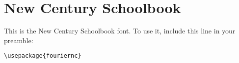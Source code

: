 \documentclass{article}
\begin{document}
\section*{New Century Schoolbook}
This is the New Century Schoolbook font.
To use it, include this line in your preamble:
\begin{verbatim}
\usepackage{fouriernc}
\end{verbatim}


\end{document}
